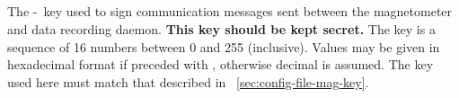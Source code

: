 \subsection{}
\label{sec:eeprom-hmac-key}
The \hmac-\mdfive\ key used to sign communication messages sent
between the magnetometer and data recording daemon. \textbf{This key
  should be kept secret.} The key is a sequence of 16 numbers between
0 and 255 (inclusive). Values may be given in hexadecimal format if
preceded with , otherwise decimal is assumed. The key used
here must match that described in
\secname~\ref{sec:config-file-mag-key}.



